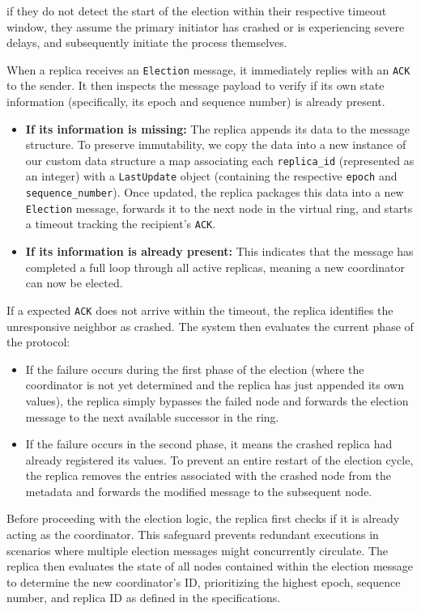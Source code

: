 if they do not detect the start of the election within their respective timeout window, they assume the primary initiator has crashed or is experiencing severe delays, and subsequently initiate the process themselves.

When a replica receives an \texttt{Election} message, it immediately replies with an \texttt{ACK} to the sender. It then inspects the message payload to verify if its own state information (specifically, its epoch and sequence number) is already present. 
\begin{itemize}
    \item \textbf{If its information is missing:} The replica appends its data to the message structure. To preserve immutability, we copy the data into a new instance of our custom data structure a map associating each \texttt{replica\_id} (represented as an integer) with a \texttt{LastUpdate} object (containing the respective \texttt{epoch} and \texttt{sequence\_number}). Once updated, the replica packages this data into a new \texttt{Election} message, forwards it to the next node in the virtual ring, and starts a timeout tracking the recipient's \texttt{ACK}.
    \item \textbf{If its information is already present:} This indicates that the message has completed a full loop through all active replicas, meaning a new coordinator can now be elected. 
\end{itemize}

If a expected \texttt{ACK} does not arrive within the timeout, the replica identifies the unresponsive neighbor as crashed. The system then evaluates the current phase of the protocol:
\begin{itemize}
    \item If the failure occurs during the first phase of the election (where the coordinator is not yet determined and the replica has just appended its own values), the replica simply bypasses the failed node and forwards the election message to the next available successor in the ring.
    \item If the failure occurs in the second phase, it means the crashed replica had already registered its values. To prevent an entire restart of the election cycle, the replica removes the entries associated with the crashed node from the metadata and forwards the modified message to the subsequent node.
\end{itemize}

Before proceeding with the election logic, the replica first checks if it is already acting as the coordinator. This safeguard prevents redundant executions in scenarios where multiple election messages might concurrently circulate. The replica then evaluates the state of all nodes contained within the election message to determine the new coordinator's ID, prioritizing the highest epoch, sequence number, and replica ID as defined in the specifications.


